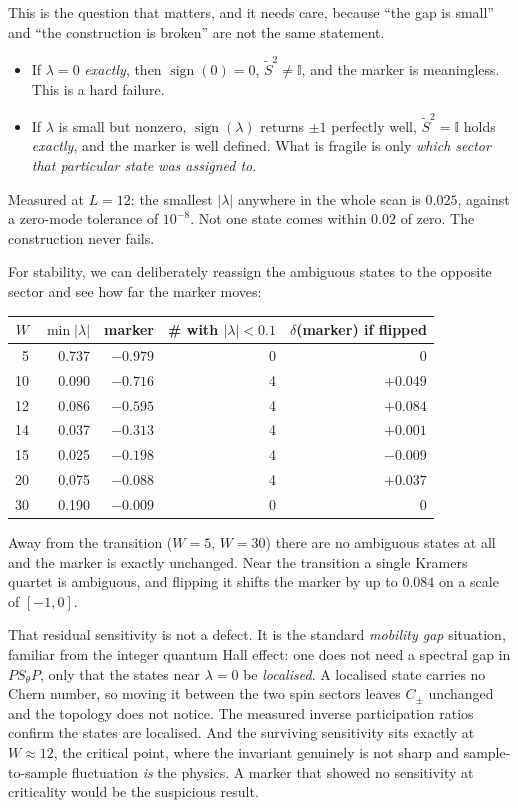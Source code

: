 \documentclass[11pt,a4paper]{article}
\newcommand{\Stilde}{\widetilde{S}}
\newcommand{\Sth}{S_\theta}
\begin{document}
This is the question that matters, and it needs care, because ``the gap is
small'' and ``the construction is broken'' are not the same statement.

\begin{itemize}
  \item If $\lambda = 0$ \emph{exactly}, then $\operatorname{sign}(0)=0$,
        $\Stilde^2 \neq \mathbb{I}$, and the marker is meaningless. This is a
        hard failure.
  \item If $\lambda$ is small but nonzero, $\operatorname{sign}(\lambda)$
        returns $\pm1$ perfectly well, $\Stilde^2 = \mathbb{I}$ holds
        \emph{exactly}, and the marker is well defined. What is fragile is only
        \emph{which sector that particular state was assigned to}.
\end{itemize}

\noindent
Measured at $L=12$: the smallest $|\lambda|$ anywhere in the whole scan is
$0.025$, against a zero-mode tolerance of $10^{-8}$. Not one state comes within
$0.02$ of zero. The construction never fails.

For stability, we can deliberately reassign the ambiguous states to the
opposite sector and see how far the marker moves:

\begin{center}
\begin{tabular}{@{}rrrrr@{}}
\toprule
$W$ & $\min|\lambda|$ & marker & \# with $|\lambda|<0.1$ & $\delta$(marker) if flipped \\
\midrule
 5 & 0.737 & $-0.979$ & 0 & $0$ \\
10 & 0.090 & $-0.716$ & 4 & $+0.049$ \\
12 & 0.086 & $-0.595$ & 4 & $+0.084$ \\
14 & 0.037 & $-0.313$ & 4 & $+0.001$ \\
15 & 0.025 & $-0.198$ & 4 & $-0.009$ \\
20 & 0.075 & $-0.088$ & 4 & $+0.037$ \\
30 & 0.190 & $-0.009$ & 0 & $0$ \\
\bottomrule
\end{tabular}
\end{center}

\noindent
Away from the transition ($W=5$, $W=30$) there are no ambiguous states at all
and the marker is exactly unchanged. Near the transition a single Kramers
quartet is ambiguous, and flipping it shifts the marker by up to $0.084$ on a
scale of $[-1,0]$.

That residual sensitivity is not a defect. It is the standard \emph{mobility
gap} situation, familiar from the integer quantum Hall effect: one does not
need a spectral gap in $P\Sth P$, only that the states near $\lambda=0$ be
\emph{localised}. A localised state carries no Chern number, so moving it
between the two spin sectors leaves $C_\pm$ unchanged and the topology does
not notice. The measured inverse participation ratios confirm the states are
localised. And the surviving sensitivity sits exactly at $W\approx12$, the
critical point, where the invariant genuinely is not sharp and
sample-to-sample fluctuation \emph{is} the physics. A marker that showed no
sensitivity at criticality would be the suspicious result.
\end{document}
